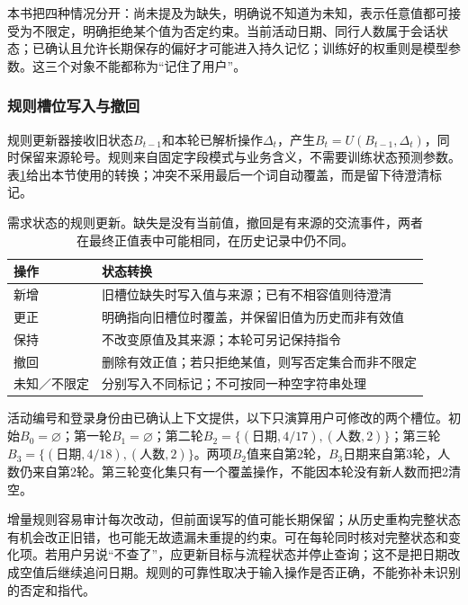本书把四种情况分开：尚未提及为缺失，明确说不知道为未知，表示任意值都可接受为不限定，明确拒绝某个值为否定约束。当前活动日期、同行人数属于会话状态；已确认且允许长期保存的偏好才可能进入持久记忆；训练好的权重则是模型参数。这三个对象不能都称为“记住了用户”。

\subsubsection{规则槽位写入与撤回}
\label{sec:nlp-dialogue-state-rule}

规则更新器接收旧状态$B_{t-1}$和本轮已解析操作$\Delta_t$，产生$B_t=U(B_{t-1},\Delta_t)$，同时保留来源轮号。规则来自固定字段模式与业务含义，不需要训练状态预测参数。表\ref{tab:nlp-dialogue-state-update}给出本节使用的转换；冲突不采用最后一个词自动覆盖，而是留下待澄清标记。

\begin{table}[htbp]
\centering
\begin{tabular}{p{22mm}p{74mm}}
\toprule
操作 & 状态转换\\
\midrule
新增 & 旧槽位缺失时写入值与来源；已有不相容值则待澄清\\
更正 & 明确指向旧槽位时覆盖，并保留旧值为历史而非有效值\\
保持 & 不改变原值及其来源；本轮可另记保持指令\\
撤回 & 删除有效正值；若只拒绝某值，则写否定集合而非不限定\\
未知／不限定 & 分别写入不同标记；不可按同一种空字符串处理\\
\bottomrule
\end{tabular}
\caption{需求状态的规则更新。缺失是没有当前值，撤回是有来源的交流事件，两者在最终正值表中可能相同，在历史记录中仍不同。}
\label{tab:nlp-dialogue-state-update}
\end{table}

活动编号和登录身份由已确认上下文提供，以下只演算用户可修改的两个槽位。初始$B_0=\varnothing$；第一轮$B_1=\varnothing$；第二轮$B_2=\{(\text{日期},4/17),(\text{人数},2)\}$；第三轮$B_3=\{(\text{日期},4/18),(\text{人数},2)\}$。两项$B_2$值来自第2轮，$B_3$日期来自第3轮，人数仍来自第2轮。第三轮变化集只有一个覆盖操作，不能因本轮没有新人数而把2清空。

增量规则容易审计每次改动，但前面误写的值可能长期保留；从历史重构完整状态有机会改正旧错，也可能无故遗漏未重提的约束。可在每轮同时核对完整状态和变化项。若用户另说“不查了”，应更新目标与流程状态并停止查询；这不是把日期改成空值后继续追问日期。规则的可靠性取决于输入操作是否正确，不能弥补未识别的否定和指代。

